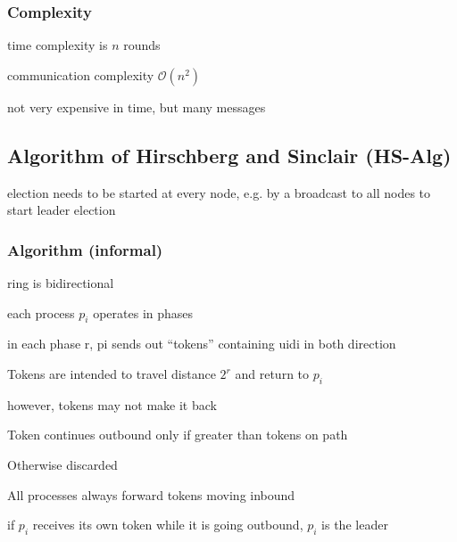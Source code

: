\subsubsection*{Complexity}
\begin{compactitem}
\item time complexity is $n$ rounds
\item communication complexity $\mathcal{O}(n^2)$
\item not very expensive in time, but many messages

\end{compactitem}

\subsection{Algorithm of Hirschberg and Sinclair (HS-Alg)}
\begin{compactitem}
	\item election needs to be started at every node, e.g. by a broadcast to all nodes to start leader election
\end{compactitem}

\subsubsection*{Algorithm (informal)}
\begin{compactitem}
	\item ring is bidirectional
	\item each process $p_i$ operates in phases
	\item in each phase r, pi sends out “tokens” containing uidi in both direction
	\item Tokens are intended to travel distance $2^r$ and return to $p_i$
	\item however, tokens may not make it back
	\item Token continues outbound only if greater than tokens on path
	\item Otherwise discarded
	\item All processes always forward tokens moving inbound
	\item if $p_i$ receives its own token while it is going outbound, $p_i$ is the leader
\end{compactitem}

